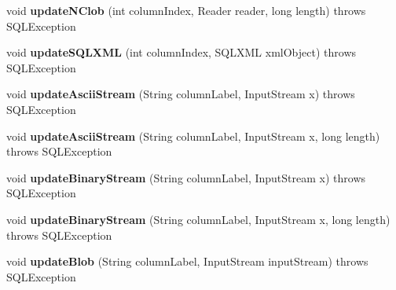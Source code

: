 \begin{DoxyCompactItemize}
void {\bfseries update\+N\+Clob} (int column\+Index, Reader reader, long length)  throws S\+Q\+L\+Exception 
\item 
\mbox{\label{classcom_1_1mysql_1_1cj_1_1jdbc_1_1result_1_1_updatable_result_set_a202aa68264e00182bd12fc64867b417e}} 
void {\bfseries update\+S\+Q\+L\+X\+ML} (int column\+Index, S\+Q\+L\+X\+ML xml\+Object)  throws S\+Q\+L\+Exception 
\item 
\mbox{\label{classcom_1_1mysql_1_1cj_1_1jdbc_1_1result_1_1_updatable_result_set_a95db253fd08bf8769d34800d66faad98}} 
void {\bfseries update\+Ascii\+Stream} (String column\+Label, Input\+Stream x)  throws S\+Q\+L\+Exception 
\item 
\mbox{\label{classcom_1_1mysql_1_1cj_1_1jdbc_1_1result_1_1_updatable_result_set_a23eaa655b627175bc4528edfd1f724ff}} 
void {\bfseries update\+Ascii\+Stream} (String column\+Label, Input\+Stream x, long length)  throws S\+Q\+L\+Exception 
\item 
\mbox{\label{classcom_1_1mysql_1_1cj_1_1jdbc_1_1result_1_1_updatable_result_set_a9032ba89281b7ed97b0a449199f64d0f}} 
void {\bfseries update\+Binary\+Stream} (String column\+Label, Input\+Stream x)  throws S\+Q\+L\+Exception 
\item 
\mbox{\label{classcom_1_1mysql_1_1cj_1_1jdbc_1_1result_1_1_updatable_result_set_a62c06e12f819f3c7e7dba30d2fc89818}} 
void {\bfseries update\+Binary\+Stream} (String column\+Label, Input\+Stream x, long length)  throws S\+Q\+L\+Exception 
\item 
\mbox{\label{classcom_1_1mysql_1_1cj_1_1jdbc_1_1result_1_1_updatable_result_set_a8966187864bd5a20977093399db0c492}} 
void {\bfseries update\+Blob} (String column\+Label, Input\+Stream input\+Stream)  throws S\+Q\+L\+Exception 
\item 
\mbox{\label{classcom_1_1mysql_1_1cj_1_1jdbc_1_1result_1_1_updatable_result_set_a434c441a4e7acfea42d9d8e4a8a761ec}} 

\end{DoxyCompactItemize}
